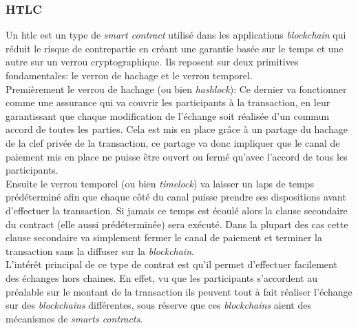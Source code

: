\subsubsection{HTLC}

Un \acrshort{htlc} est un type de \textit{\gls{smart contract}} utilisé dans les applications \textit{\gls{blockchain}} qui réduit le risque de contrepartie en créant une garantie basée sur le temps et une autre sur un verrou cryptographique\cite{narayanam2022generalized}.
Ils reposent sur deux primitives fondamentales: le verrou de hachage et le verrou temporel.\\
Premièrement le verrou de hachage (ou bien \textit{hashlock}): Ce dernier va fonctionner comme une assurance qui va couvrir les participants à la transaction, en leur garantissant que chaque modification de l'échange soit réalisée d'un commun accord de toutes les parties.
Cela est mis en place grâce à un partage du hachage de la clef privée de la transaction, ce partage va donc impliquer que le canal de paiement mis en place ne puisse être ouvert ou fermé qu'avec l'accord de tous les participants.\\
Ensuite le verrou temporel (ou bien \textit{timelock}) va laisser un laps de temps prédéterminé afin que chaque côté du canal puisse prendre ses dispositions avant d'effectuer la transaction. Si jamais ce temps est écoulé alors la clause secondaire du contract (elle aussi prédéterminée) sera exécuté. 
Dans la plupart des cas cette clause secondaire va simplement fermer le canal de paiement et terminer la transaction sans la diffuser sur la \textit{\gls{blockchain}}.\\
L’intérêt principal de ce type de contrat est qu'il permet d'effectuer facilement des échanges hors chaines. En effet, vu que les participants s'accordent au préalable sur le montant de la transaction ils peuvent tout à fait réaliser l'échange sur des \textit{\gls{blockchain}s} différentes, sous réserve que ces \textit{\gls{blockchain}s} aient des mécanismes de \textit{smarts contracts}.

